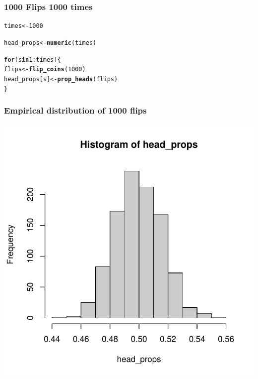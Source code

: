 \documentclass[12pt]{beamer}\usepackage[]{graphicx}\usepackage[]{color}
\makeatletter
\newcommand{\hlnum}[1]{\textcolor[rgb]{0.686,0.059,0.569}{#1}}%
\newcommand{\hlopt}[1]{\textcolor[rgb]{0,0,0}{#1}}%
\newcommand{\hlstd}[1]{\textcolor[rgb]{0.345,0.345,0.345}{#1}}%
\newcommand{\hlkwa}[1]{\textcolor[rgb]{0.161,0.373,0.58}{\textbf{#1}}}%
\newcommand{\hlkwb}[1]{\textcolor[rgb]{0.69,0.353,0.396}{#1}}%
\newcommand{\hlkwd}[1]{\textcolor[rgb]{0.737,0.353,0.396}{\textbf{#1}}}%
\newenvironment{kframe}{%
 \def\at@end@of@kframe{}%
 \ifinner\ifhmode%
  \def\at@end@of@kframe{\end{minipage}}%
  \begin{minipage}{\columnwidth}%
 \fi\fi%
 \def\FrameCommand##1{\hskip\@totalleftmargin \hskip-\fboxsep
 \colorbox{shadecolor}{##1}\hskip-\fboxsep
     \hskip-\linewidth \hskip-\@totalleftmargin \hskip\columnwidth}%
 \MakeFramed {\advance\hsize-\width
   \@totalleftmargin\z@ \linewidth\hsize
   \@setminipage}}%
 {\par\unskip\endMakeFramed%
 \at@end@of@kframe}
\newenvironment{knitrout}{}{} %
\makeatother
\begin{document}

\begin{frame}[fragile]
\frametitle{1000 Flips 1000 times}

\begin{knitrout}\footnotesize
{}\color{fgcolor}\begin{kframe}
\begin{alltt}
\hlstd{times} \hlkwb{<-} \hlnum{1000}

\hlstd{head_props} \hlkwb{<-} \hlkwd{numeric}\hlstd{(times)}

\hlkwa{for} \hlstd{(s} \hlkwa{in} \hlnum{1}\hlopt{:}\hlstd{times) \{}
  \hlstd{flips} \hlkwb{<-} \hlkwd{flip_coins}\hlstd{(}\hlnum{1000}\hlstd{)}
  \hlstd{head_props[s]} \hlkwb{<-} \hlkwd{prop_heads}\hlstd{(flips)}
\hlstd{\}}
\end{alltt}
\end{kframe}
\end{knitrout}

\end{frame}


\begin{frame}[fragile]
\frametitle{Empirical distribution of 1000 flips}

\begin{knitrout}\footnotesize
{}\color{fgcolor}

{\centering \includegraphics[width=.7\linewidth,height=.7\linewidth]{figure/unnamed-chunk-18-1} 

}



\end{knitrout}

\end{frame}
\end{document}
